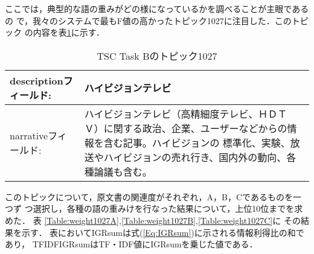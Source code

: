 ここでは，典型的な語の重みがどの様になっているかを調べることが主眼であるの
で，我々のシステムで最もF値の高かったトピック1027に注目した．このトピック
の内容を表\ref{Table:Topic1027}に示す．
\begin{table}[htbp]
 \caption{TSC Task Bのトピック1027}
 \label{Table:Topic1027}
 \begin{tabular}{|lp{100mm}|}
  \hline
  {\sc description}フィールド: & ハイビジョンテレビ\\
  \hline
  {\sc narrative}フィールド: & ハイビジョンテレビ（高精細度テレビ、ＨＤＴ
  Ｖ）に関する政治、企業、ユーザーなどからの情報を含む記事。ハイビジョンの
  標準化、実験、放送やハイビジョンの売れ行き、国内外の動向、各種論議も含む。\\
  \hline
 \end{tabular}
\end{table}
このトピックについて，原文書の関連度がそれぞれ，A，B，Cであるものを一つず
つ選択し，各種の語の重みけを行なった結果について，上位10位までを求めた．
表
\ref{Table:weight1027A},\ref{Table:weight1027B},\ref{Table:weight1027C}に
その結果を示す．
表においてIGRsumは式(\ref{Eq:IGRsum})に示される情報利得比の和であり，
TFIDFIGRsumはTF・IDF値にIGRsumを乗じた値である．

